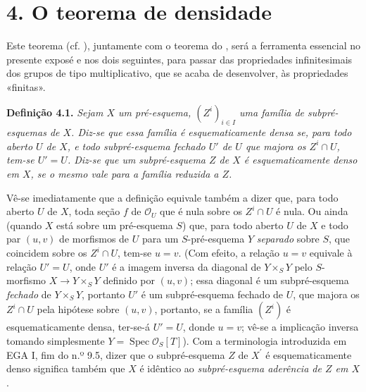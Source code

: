 

\begingroup
\renewcommand{\thefootnote}{\(\ast\)}
\section*{4. O teorema de densidade\protect\footnotemark}
\addtocounter{footnote}{-1}
\endgroup
{}

Este teorema (cf. ),
juntamente com o teorema do
, será a ferramenta essencial
no presente exposé e nos dois seguintes, para passar das propriedades
infinitesimais dos grupos de tipo multiplicativo, que se acaba de
desenvolver, às propriedades «finitas».

\medskip
\noindent{}\textbf{Definição 4.1.}
\textit{Sejam \(X\) um pré-esquema, \((Z^i)_{i\in I}\) uma família
de subpré-esquemas de \(X\). Diz-se que essa família é esquematicamente
densa se, para todo aberto \(U\) de \(X\), e todo subpré-esquema
fechado \(U'\) de \(U\) que majora os \(Z^i\cap U\), tem-se
\(U'=U\). Diz-se que um subpré-esquema \(Z\) de \(X\) é
esquematicamente denso em \(X\), se o mesmo vale para a família
reduzida a \(Z\).}

Vê-se imediatamente que a definição equivale também a dizer que,
para todo aberto \(U\) de \(X\), toda seção \(f\) de
\(\mathscr O_U\) que é nula sobre os \(Z^i\cap U\) é nula.
Ou ainda (quando
\(X\) está sobre um pré-esquema \(S\)) que, para todo aberto \(U\)
de \(X\) e todo par \((u,v)\) de morfismos de \(U\) para um
\(S\)-pré-esquema \(Y\) \emph{separado} sobre \(S\), que
coincidem sobre os \(Z^i\cap U\), tem-se \(u=v\).
(Com efeito, a relação \(u=v\) equivale à relação \(U'=U\), onde
\(U'\) é a imagem
inversa da diagonal de \(Y\times_S Y\) pelo \(S\)-morfismo
\(X\to Y\times_S Y\) definido por \((u,v)\); essa diagonal é um
subpré-esquema \emph{fechado} de \(Y\times_S Y\), portanto \(U'\)
é um subpré-esquema fechado de \(U\), que majora os \(Z^i\cap U\)
pela hipótese sobre \((u,v)\), portanto, se a família \((Z^i)\)
é esquematicamente densa, ter-se-á \(U'=U\), donde \(u=v\);
vê-se a implicação inversa tomando simplesmente
\(Y=\operatorname{Spec}\mathscr O_S[T]\)). Com a terminologia
introduzida em EGA I, fim do n.º 9.5, dizer que o subpré-esquema
\(Z\) de \(X^{\prime}\) é esquematicamente denso significa também que
\(X\) é idêntico ao \emph{subpré-esquema aderência de \(Z\) em \(X\)}.

